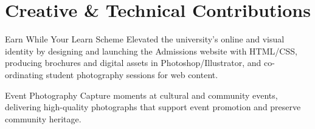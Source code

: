 \vspace{-1em}
\section{Creative \& Technical Contributions}
\begin{sectionContainer}
	{Earn While Your Learn Scheme} {Elevated the university's online and visual identity by designing and launching the Admissions website with HTML/CSS, producing brochures and digital assets in Photoshop/Illustrator, and co-ordinating student photography sessions for web content.}
\end{sectionContainer}

\begin{sectionContainer}
	{Event Photography} {Capture moments at cultural and community events, delivering high-quality photographs that support event promotion and preserve community heritage.}
\end{sectionContainer}

\nopagebreak[4]